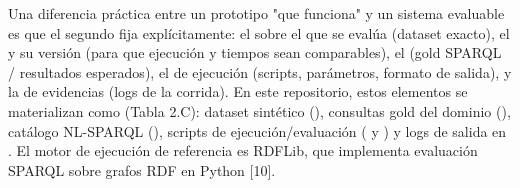 {}\markdownRendererInterblockSeparator
{}Una diferencia práctica entre un prototipo "que funciona" y un sistema evaluable es que el segundo fija explícitamente:\markdownRendererInterblockSeparator
{}\markdownRendererUlBeginTight
\markdownRendererUlItem el  sobre el que se evalúa (dataset exacto),\markdownRendererUlItemEnd 
\markdownRendererUlItem el  y su versión (para que ejecución y tiempos sean comparables),\markdownRendererUlItemEnd 
\markdownRendererUlItem el  (gold SPARQL / resultados esperados),\markdownRendererUlItemEnd 
\markdownRendererUlItem el  de ejecución (scripts, parámetros, formato de salida),\markdownRendererUlItemEnd 
\markdownRendererUlItem y la  de evidencias (logs de la corrida).\markdownRendererUlItemEnd 
\markdownRendererUlEndTight \markdownRendererInterblockSeparator
{}En este repositorio, estos elementos se materializan como (Tabla 2.C): dataset sintético (), consultas gold del dominio (), catálogo NL-SPARQL (), scripts de ejecución/evaluación ( y ) y logs de salida en . El motor de ejecución de referencia es RDFLib, que implementa evaluación SPARQL sobre grafos RDF en Python [10].\markdownRendererInterblockSeparator
{}\markdownRendererInterblockSeparator
